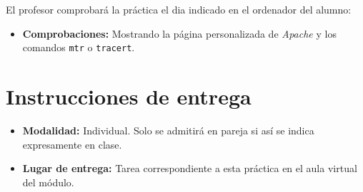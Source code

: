\documentclass[a4paper]{article}
\begin{document}
El profesor comprobará la práctica el dia indicado en el ordenador del alumno:
\begin{itemize}
\item \textbf{Comprobaciones:} Mostrando la página personalizada de \emph{Apache} y los comandos \texttt{mtr} o \texttt{tracert}.
\end{itemize}
\section{Instrucciones de entrega}
\label{sec:org000000f}
\begin{itemize}
\item \textbf{Modalidad:} Individual. Solo se admitirá en pareja si así se indica expresamente en clase.
\item \textbf{Lugar de entrega:} Tarea correspondiente a esta práctica en el aula virtual del módulo.
\end{itemize}
\end{document}
